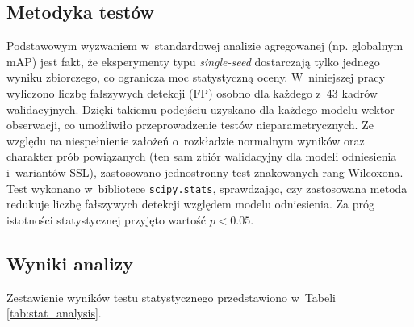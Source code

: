 \subsection{Metodyka testów}
Podstawowym wyzwaniem w~standardowej analizie agregowanej (np. globalnym mAP) jest fakt, że eksperymenty typu \textit{single-seed} dostarczają tylko jednego wyniku zbiorczego, co ogranicza moc statystyczną oceny. W~niniejszej pracy wyliczono liczbę fałszywych detekcji (FP) osobno dla każdego z~43 kadrów walidacyjnych. Dzięki takiemu podejściu uzyskano dla każdego modelu wektor obserwacji, co umożliwiło przeprowadzenie testów nieparametrycznych.
Ze względu na niespełnienie założeń o~rozkładzie normalnym wyników oraz charakter prób powiązanych (ten sam zbiór walidacyjny dla modeli odniesienia i~wariantów SSL), zastosowano jednostronny test znakowanych rang Wilcoxona. Test wykonano w~bibliotece \texttt{scipy.stats}, sprawdzając, czy zastosowana metoda redukuje liczbę fałszywych detekcji względem modelu odniesienia. Za próg istotności statystycznej przyjęto wartość $p < 0.05$.

\subsection{Wyniki analizy}
Zestawienie wyników testu statystycznego przedstawiono w~Tabeli \ref{tab:stat_analysis}.

